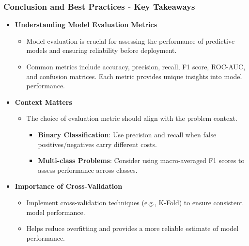 \documentclass[aspectratio=169]{beamer}
\begin{document}
\begin{frame}[fragile]
  \frametitle{Conclusion and Best Practices - Key Takeaways}
  \begin{itemize}
    \item \textbf{Understanding Model Evaluation Metrics}
    \begin{itemize}
      \item Model evaluation is crucial for assessing the performance of predictive models and ensuring reliability before deployment.
      \item Common metrics include accuracy, precision, recall, F1 score, ROC-AUC, and confusion matrices. Each metric provides unique insights into model performance.
    \end{itemize}
    
    \item \textbf{Context Matters}
    \begin{itemize}
      \item The choice of evaluation metric should align with the problem context.
      \begin{itemize}
        \item \textbf{Binary Classification}: Use precision and recall when false positives/negatives carry different costs.
        \item \textbf{Multi-class Problems}: Consider using macro-averaged F1 scores to assess performance across classes.
      \end{itemize}
    \end{itemize}
    
    \item \textbf{Importance of Cross-Validation}
    \begin{itemize}
      \item Implement cross-validation techniques (e.g., K-Fold) to ensure consistent model performance.
      \item Helps reduce overfitting and provides a more reliable estimate of model performance.
    \end{itemize}
  \end{itemize}
\end{frame}
\end{document}
